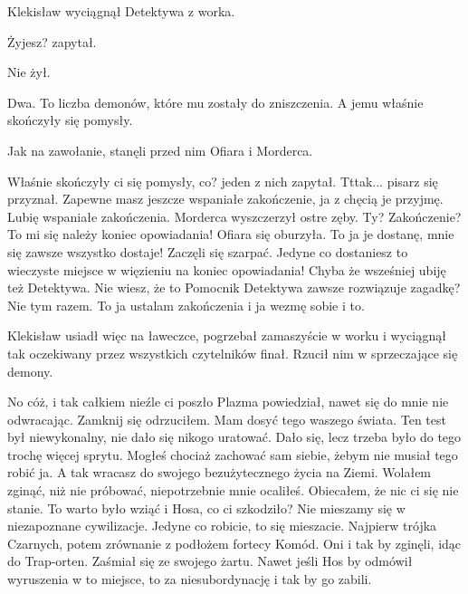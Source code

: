 \divider{}

Klekisław wyciągnął Detektywa z worka.
\begin{dialogue}
\ds{} Żyjesz? \dm{} zapytał. 
\end{dialogue}
Nie żył.

Dwa.
To liczba demonów, które mu zostały do zniszczenia.
A jemu właśnie skończyły się pomysły.

Jak na zawołanie, stanęli przed nim Ofiara i Morderca.
\begin{dialogue}
\ds{} Właśnie skończyły ci się pomysły, co? \dm{} jeden z nich zapytał.
\ds{} Tttak... \dm{} pisarz się przyznał.
\ds{} Zapewne masz jeszcze wspaniałe zakończenie, ja z chęcią je przyjmę. Lubię wspaniałe zakończenia. \dm{} Morderca wyszczerzył ostre zęby.
\ds{} Ty? Zakończenie? To mi się należy koniec opowiadania! \dm{} Ofiara się oburzyła.
\ds{} To ja je dostanę, mnie się zawsze wszystko dostaje! \dm{} Zaczęli się szarpać.
\ds{} Jedyne co dostaniesz to wieczyste miejsce w więzieniu na koniec opowiadania!
\ds{} Chyba że wsześniej ubiję też Detektywa.
\ds{} Nie wiesz, że to Pomocnik Detektywa zawsze rozwiązuje zagadkę?
\ds{} Nie tym razem. To ja ustalam zakończenia i ja wezmę sobie i to.
\end{dialogue}

Klekisław usiadł więc na ławeczce, pogrzebał zamaszyście w worku i wyciągnął tak oczekiwany przez wszystkich czytelników finał.
Rzucił nim w sprzeczające się demony.

\divider{}

\begin{dialogue}
\ds{} No cóż, i tak całkiem nieźle ci poszło \dm{} Plazma powiedział, nawet się do mnie nie odwracając. 
\ds{} Zamknij się \dm{} odrzuciłem. \dm{} Mam dosyć tego waszego świata. Ten test był niewykonalny, nie dało się nikogo uratować.
\ds{} Dało się, lecz trzeba było do tego trochę więcej sprytu. Mogłeś chociaż zachować sam siebie, żebym nie musiał tego robić ja. 
A tak wracasz do swojego bezużytecznego życia na Ziemi.
\ds{} Wolałem zginąć, niż nie próbować, niepotrzebnie mnie ocaliłeś.
\ds{} Obiecałem, że nic ci się nie stanie.
\ds{} To warto było wziąć i Hosa, co ci szkodziło?
\ds{} Nie mieszamy się w niezapoznane cywilizacje.
\ds{} Jedyne co robicie, to się mieszacie. Najpierw trójka Czarnych, potem zrównanie z podłożem fortecy Komód.
\ds{} Oni i tak by zginęli, idąc do Trap-orten. \dm{} Zaśmiał się ze swojego żartu. \dm{} Nawet jeśli Hos by odmówił wyruszenia w to miejsce, to za niesubordynację i tak by go zabili.
\end{dialogue}

